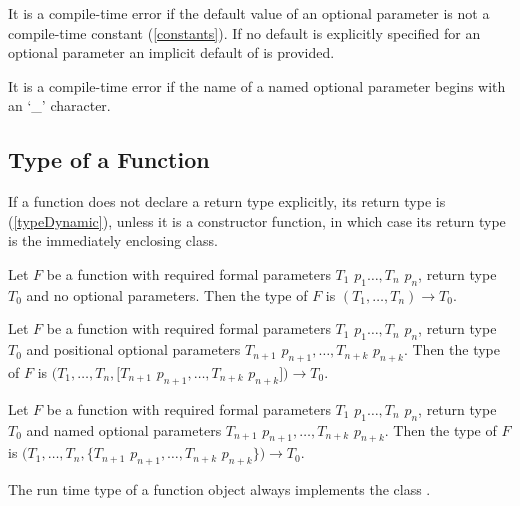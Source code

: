 \documentclass{article}
\begin{document}
\LMHash{}
It is a compile-time error if the default value of an optional parameter is not a compile-time constant (\ref{constants}). If no default is explicitly specified for an optional parameter an implicit default of \NULL{} is provided.

\LMHash{}
It is a compile-time error if the name of a named optional parameter begins with an `\_' character.


\subsection{Type of a Function}

\LMHash{}
If a function does not declare a return type explicitly, its return type is \DYNAMIC{} (\ref{typeDynamic}), unless it is a constructor function, in which case its return type is the immediately enclosing class.

\LMHash{}
Let $F$ be a function with required formal parameters $T_1$ $p_1 \ldots, T_n$ $p_n$, return type $T_0$ and no optional parameters. Then the type of $F$ is $(T_1 ,\ldots, T_n) \rightarrow T_0$.

\LMHash{}
Let $F$ be a function with required formal parameters $T_1$ $p_1 \ldots, T_n$ $p_n$, return type $T_0$ and positional optional parameters $T_{n+1}$ $p_{n+1}, \ldots, T_{n+k}$ $ p_{n+k}$. Then the type of $F$ is $(T_1 ,\ldots, T_n, [T_{n+1}$ $p_{n+1}, \ldots, T_{n+k}$  $p_{n+k}]) \rightarrow T_0$.

\LMHash{}
Let $F$ be a function with required formal parameters $T_1$ $p_1 \ldots, T_n$ $p_n$, return type $T_0$ and named optional parameters $T_{n+1}$ $p_{n+1}, \ldots, T_{n+k}$ $ p_{n+k}$. Then the type of $F$ is $(T_1 ,\ldots, T_n, \{T_{n+1}$ $p_{n+1}, \ldots, T_{n+k}$  $p_{n+k}\}) \rightarrow T_0$.

\LMHash{}
The run time type of a function object always implements the class . 
\end{document}
